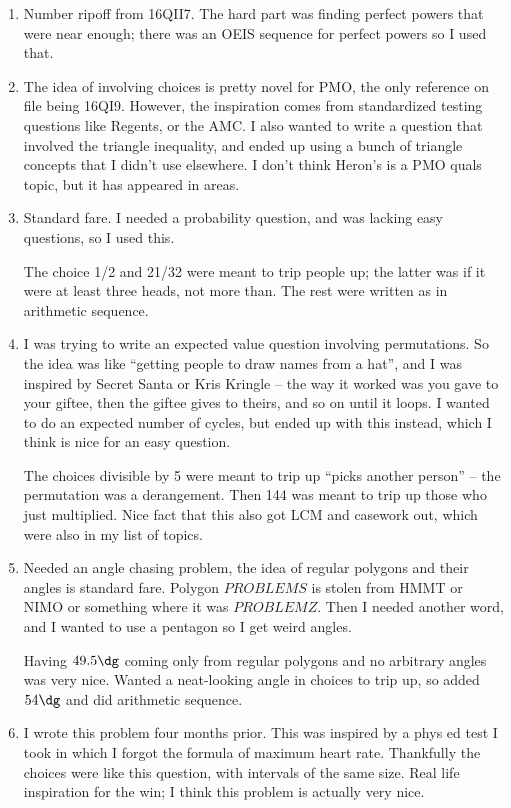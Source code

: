\documentclass[10pt,paper=letter]{scrartcl}
\begin{document}
\begin{enumerate}
  \item Number ripoff from 16QII7. The hard part was finding perfect powers that were near enough; there was an OEIS sequence for perfect powers so I used that.

  \item The idea of involving choices is pretty novel for PMO, the only reference on file being 16QI9. However, the inspiration comes from standardized testing questions like Regents, or the AMC. I also wanted to write a question that involved the triangle inequality, and ended up using a bunch of triangle concepts that I didn't use elsewhere. I don't think Heron's is a PMO quals topic, but it has appeared in areas.

  \item Standard fare. I needed a probability question, and was lacking easy questions, so I used this.

  The choice 1/2 and 21/32 were meant to trip people up; the latter was if it were at least three heads, not more than. The rest were written as in arithmetic sequence.

  \item I was trying to write an expected value question involving permutations. So the idea was like ``getting people to draw names from a hat'', and I was inspired by Secret Santa or Kris Kringle -- the way it worked was you gave to your giftee, then the giftee gives to theirs, and so on until it loops. I wanted to do an expected number of cycles, but ended up with this instead, which I think is nice for an easy question.

  The choices divisible by 5 were meant to trip up ``picks another person'' -- the permutation was a derangement. Then 144 was meant to trip up those who just multiplied. Nice fact that this also got LCM and casework out, which were also in my list of topics.

  \item Needed an angle chasing problem, the idea of regular polygons and their angles is standard fare. Polygon $PROBLEMS$ is stolen from HMMT or NIMO or something where it was $PROBLEMZ$. Then I needed another word, and I wanted to use a pentagon so I get weird angles. 

  Having $49.5\dg$ coming only from regular polygons and no arbitrary angles was very nice. Wanted a neat-looking angle in choices to trip up, so added $54\dg$ and did arithmetic sequence.

  \item I wrote this problem four months prior. This was inspired by a phys ed test I took in which I forgot the formula of maximum heart rate. Thankfully the choices were like this question, with intervals of the same size. Real life inspiration for the win; I think this problem is actually very nice.


\end{enumerate}
\end{document}
